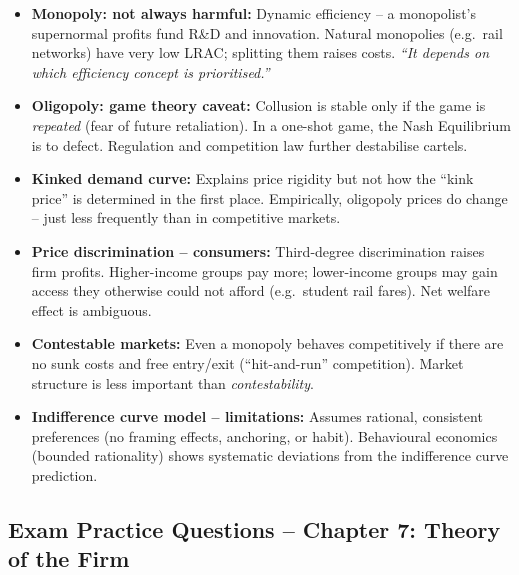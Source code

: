 \documentclass[11pt, a4paper, twoside]{book}
\begin{document}
\begin{tcolorbox}[enhanced,colback=EvalBg,colframe=EvalFrame,arc=0pt,boxrule=1pt,title={\bfseries\color{EvalFrame}Evaluation: Market Structures and Price Discrimination},fonttitle=\small]
\small\RaggedRight
\begin{itemize}[itemsep=2pt,topsep=2pt]
  \item \textbf{Monopoly: not always harmful:} Dynamic efficiency -- a monopolist's supernormal profits fund R\&D and innovation. Natural monopolies (e.g.\ rail networks) have very low LRAC; splitting them raises costs. \textit{``It depends on which efficiency concept is prioritised.''}
  \item \textbf{Oligopoly: game theory caveat:} Collusion is stable only if the game is \textit{repeated} (fear of future retaliation). In a one-shot game, the Nash Equilibrium is to defect. Regulation and competition law further destabilise cartels.
  \item \textbf{Kinked demand curve:} Explains price rigidity but not how the ``kink price'' is determined in the first place. Empirically, oligopoly prices do change -- just less frequently than in competitive markets.
  \item \textbf{Price discrimination -- consumers:} Third-degree discrimination raises firm profits. Higher-income groups pay more; lower-income groups may gain access they otherwise could not afford (e.g.\ student rail fares). Net welfare effect is ambiguous.
  \item \textbf{Contestable markets:} Even a monopoly behaves competitively if there are no sunk costs and free entry/exit (``hit-and-run'' competition). Market structure is less important than \textit{contestability}.
  \item \textbf{Indifference curve model -- limitations:} Assumes rational, consistent preferences (no framing effects, anchoring, or habit). Behavioural economics (bounded rationality) shows systematic deviations from the indifference curve prediction.
\end{itemize}
\end{tcolorbox}

\subsection{Exam Practice Questions -- Chapter 7: Theory of the Firm}
\end{document}
